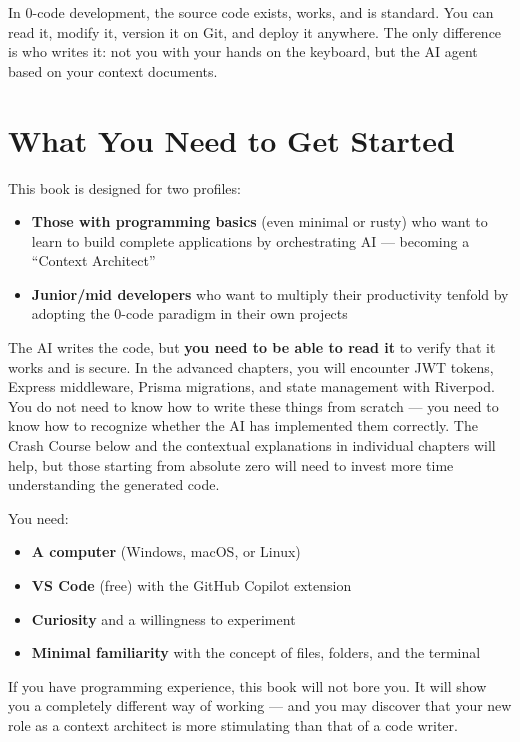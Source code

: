 In 0-code development, the source code exists, works, and is standard. You can read it, modify it, version it on Git, and deploy it anywhere. The only difference is who writes it: not you with your hands on the keyboard, but the AI agent based on your context documents.

\section*{What You Need to Get Started}

This book is designed for two profiles:

\begin{itemize}
  \item \textbf{Those with programming basics} (even minimal or rusty) who want to learn to build complete applications by orchestrating AI --- becoming a ``Context Architect''
  \item \textbf{Junior/mid developers} who want to multiply their productivity tenfold by adopting the 0-code paradigm in their own projects
\end{itemize}

The AI writes the code, but \textbf{you need to be able to read it} to verify that it works and is secure. In the advanced chapters, you will encounter JWT tokens, Express middleware, Prisma migrations, and state management with Riverpod. You do not need to know how to write these things from scratch --- you need to know how to recognize whether the AI has implemented them correctly. The Crash Course below and the contextual explanations in individual chapters will help, but those starting from absolute zero will need to invest more time understanding the generated code.

You need:

\begin{itemize}
  \item \textbf{A computer} (Windows, macOS, or Linux)
  \item \textbf{VS Code} (free) with the GitHub Copilot extension
  \item \textbf{Curiosity} and a willingness to experiment
  \item \textbf{Minimal familiarity} with the concept of files, folders, and the terminal
\end{itemize}

If you have programming experience, this book will not bore you. It will show you a completely different way of working --- and you may discover that your new role as a context architect is more stimulating than that of a code writer.

